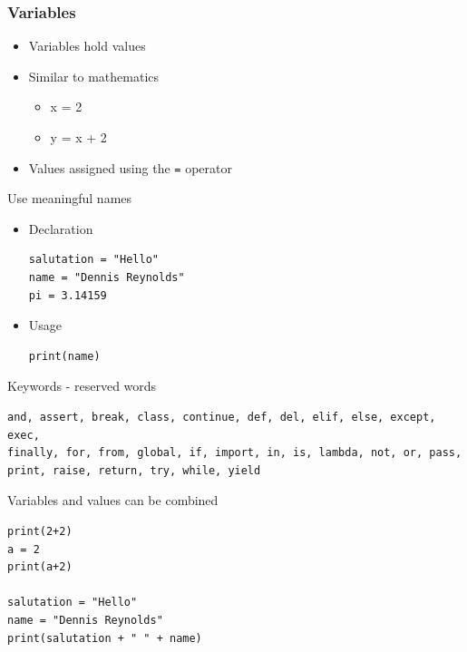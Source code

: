 \documentclass[10pt, a4paper]{beamer} %
\begin{document}
\begin{frame}\frametitle{Variables}
    \begin{itemize}
        \item Variables hold values
        \item Similar to mathematics
        \begin{itemize}
            \item x = 2
            \item y = x + 2
        \end{itemize}
        \item Values assigned using the \texttt{=} operator
    \end{itemize}
    \begin{examples}
    Use meaningful names
    \begin{itemize}
        \item Declaration
        \begin{lstlisting}
salutation = "Hello"
name = "Dennis Reynolds"
pi = 3.14159
        \end{lstlisting}
        \item Usage
        \begin{lstlisting}
print(name)
        \end{lstlisting}
    \end{itemize}
        
    \end{examples}
\framebreak
\begin{block}{Keywords - reserved words}

\begin{lstlisting}
and, assert, break, class, continue, def, del, elif, else, except, exec, 
finally, for, from, global, if, import, in, is, lambda, not, or, pass, 
print, raise, return, try, while, yield
\end{lstlisting}
    
\end{block}
\framebreak
\begin{block}{Variables and values can be combined}
    \begin{lstlisting}
print(2+2)
a = 2
print(a+2)

salutation = "Hello"
name = "Dennis Reynolds"
print(salutation + " " + name)
    \end{lstlisting}
\end{block}
\end{frame}
\end{document}
